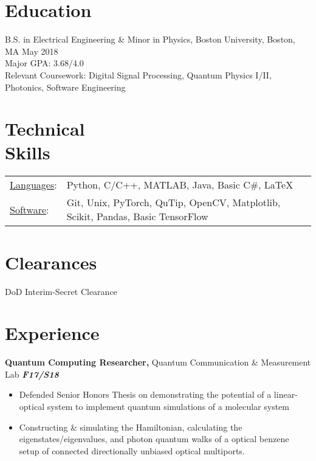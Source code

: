 \documentclass[margin]{res}
\begin{document}
\begin{resume} 
 

\section{Education} 
B.S. in Electrical Engineering \& Minor in Physics, Boston University, Boston, MA \hfill May 2018 \\
Major GPA: 3.68/4.0 \\
Relevant Coursework: Digital Signal Processing, Quantum Physics I/II, Photonics, Software Engineering



\section{Technical \\ Skills}
   \begin{tabular}{l p{5.0in}}
     \underline{Languages}: & Python, C/C++, MATLAB, Java, Basic C\#, LaTeX \\ 
     \underline{Software}: & Git, Unix, PyTorch, QuTip, OpenCV, Matplotlib, Scikit, Pandas, Basic TensorFlow
 \end{tabular}





 
\section{Clearances}
DoD Interim-Secret Clearance 

\section{Experience}
{\bf Quantum Computing Researcher,} Quantum Communication \& Measurement Lab \hfill  \textbf{\textit{F17/S18}}
\begin{itemize}  pt
\item Defended Senior Honors Thesis on demonstrating the potential of a linear-optical system to implement quantum simulations of a molecular system
\item Constructing \& simulating the Hamiltonian, calculating the eigenstates/eigenvalues, and photon quantum walks of a optical benzene setup of connected directionally unbiased optical multiports.
\end{itemize}




\end{resume}
\end{document}
